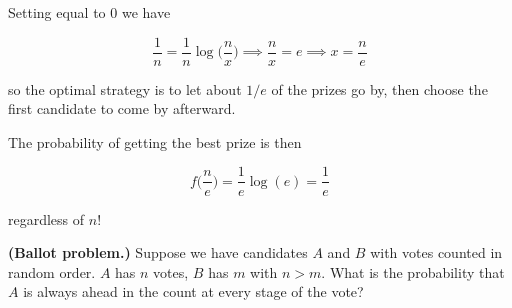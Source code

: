 \begin{solution}
Setting equal to 0 we have

\[
\frac{1}{n} = \frac{1}{n} \log \bigg( \frac{n}{x} \bigg) \implies \frac{n}{x} = e \implies \boxed{x= \frac{n}{e}}
\]

so the optimal strategy is to let about \(1/e\) of the prizes go by, then choose the first candidate to come by afterward. 

\begin{remark} The probability of getting the best prize is then

\[
f \bigg( \frac{n}{e} \bigg) = \frac{1}{e} \log(e) = \frac{1}{e}
\]

regardless of \(n\)!

\end{remark}

\end{solution}


\begin{exercise} \textbf{(Ballot problem.)} Suppose we have candidates \(A\) and \(B\) with votes counted in random order. \(A\) has \(n\) votes, \(B\) has \(m\) with \(n > m\). What is the probability that \(A\) is always ahead in the count at every stage of the vote?

\end{exercise}

